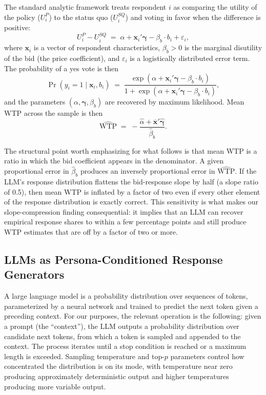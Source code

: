 \documentclass[12pt]{article}
\begin{document}
The standard analytic framework treats respondent $i$ as comparing the utility of the policy ($U_i^P$) to the status quo ($U_i^{SQ}$) and voting in favor when the difference is positive:
\begin{equation}
    U_i^P - U_i^{SQ} \;=\; \alpha + \mathbf{x}_i'\boldsymbol{\gamma} - \beta_b \cdot b_i + \varepsilon_i,
    \label{eq:bg-utility}
\end{equation}
where $\mathbf{x}_i$ is a vector of respondent characteristics, $\beta_b > 0$ is the marginal disutility of the bid (the price coefficient), and $\varepsilon_i$ is a logistically distributed error term. The probability of a yes vote is then
\begin{equation}
    \Pr(y_i = 1 \mid \mathbf{x}_i, b_i) \;=\; \frac{\exp(\alpha + \mathbf{x}_i'\boldsymbol{\gamma} - \beta_b \cdot b_i)}{1 + \exp(\alpha + \mathbf{x}_i'\boldsymbol{\gamma} - \beta_b \cdot b_i)},
    \label{eq:bg-logit}
\end{equation}
and the parameters $(\alpha, \boldsymbol{\gamma}, \beta_b)$ are recovered by maximum likelihood. Mean WTP across the sample is then
\begin{equation}
    \widehat{\text{WTP}} \;=\; -\frac{\hat{\alpha} + \overline{\mathbf{x}}'\hat{\boldsymbol{\gamma}}}{\hat{\beta}_b}.
    \label{eq:bg-wtp}
\end{equation}

The structural point worth emphasizing for what follows is that mean WTP is a ratio in which the bid coefficient appears in the denominator. A given proportional error in $\hat{\beta}_b$ produces an inversely proportional error in $\widehat{\text{WTP}}$. If the LLM's response distribution flattens the bid-response slope by half (a slope ratio of 0.5), then mean WTP is inflated by a factor of two even if every other element of the response distribution is exactly correct. This sensitivity is what makes our slope-compression finding consequential: it implies that an LLM can recover empirical response shares to within a few percentage points and still produce WTP estimates that are off by a factor of two or more.

\subsection{LLMs as Persona-Conditioned Response Generators}\label{sec:bg-llms}

A large language model is a probability distribution over sequences of tokens, parameterized by a neural network and trained to predict the next token given a preceding context. For our purposes, the relevant operation is the following: given a prompt (the ``context''), the LLM outputs a probability distribution over candidate next tokens, from which a token is sampled and appended to the context. The process iterates until a stop condition is reached or a maximum length is exceeded. Sampling temperature and top-$p$ parameters control how concentrated the distribution is on its mode, with temperature near zero producing approximately deterministic output and higher temperatures producing more variable output.
\end{document}
